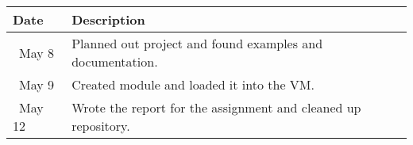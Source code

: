 \begin{tabular}{l l}\textbf{Date} & \textbf{Description}\\\hline
\ May 8 & Planned out project and found examples and documentation.\\\hline
\ May 9 & Created module and loaded it into the VM.\\\hline
\ May 12 & Wrote the report for the assignment and cleaned up repository.\\\hline
\end{tabular}
